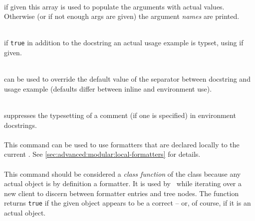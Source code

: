 \documentclass[12pt]{scrartcl}
\begin{document}
\begin{itemize*}
\item {}\\
if given this array is used to populate the arguments with actual values.
Otherwise (or if not enough args are given) the argument \emph{names} are
printed.

\item {}\\
if \texttt{true} in addition to the docstring an actual usage example is
typset, using  if given.

\item {}\\
can be used to override the default value of the separator between docstring
and usage example (defaults differ between inline and environment use).

\item {}\\
suppresses the typesetting of a comment (if one is specified) in environment
docstrings.
\end{itemize*}

\paragraph{}
\label{sec:advanced:formatter:format}

This command can be used to use formatters that are declared locally to the
current .  See \vref{sec:advanced:modular:local-formatters} for
details.

\paragraph{}
\label{sec:advanced:formatter:is-formatter}

This command should be considered a \emph{class function} of the
 class because any actual  object is by
definition a formatter.  It is used by \luaformatters\ while iterating over a new
client to discern between formatter entries and tree nodes.  The function
returns \texttt{true} if the given object appears to be a correct
 -- or, of course, if it is an actual
 object.


\paragraph{}
\label{sec:advanced:formatter:replace}
\end{document}

